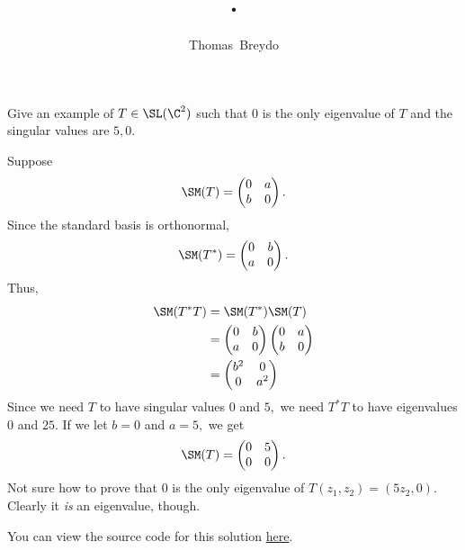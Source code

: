 \documentclass{amsart}
\title{\pagenum.\probnum}
\author{Thomas\ Breydo}
\newcommand{\pagenum}{238}
\newcommand{\probnum}{2}
\begin{document}
\maketitle

\begin{problem*}
Give an example of $T\in\SL(\C^2)$ such that 0 is the only eigenvalue
of $T$ and the singular values are $5,0.$
\end{problem*}

\vspace{0.5in}

Suppose
\begin{align*}
    \SM(T)=\begin{pmatrix}
        0 & a \\
        b & 0
    \end{pmatrix}.
\end{align*}
Since the standard basis is orthonormal,
\begin{align*}
    \SM(T^*)=\begin{pmatrix}
        0 & b \\
        a & 0
    \end{pmatrix}.
\end{align*}
Thus,
\begin{align*}
    \SM(T^* T) &= \SM(T^*)\SM(T) \\
               &= \begin{pmatrix}
                   0 & b \\
                   a & 0
               \end{pmatrix}
               \begin{pmatrix}
                   0 & a \\
                   b & 0
               \end{pmatrix} \\
               &= \begin{pmatrix}
                   b^2 & 0 \\
                   0 & a^2
               \end{pmatrix}
\end{align*}
Since we need $T$ to have singular values $0$ and $5,$ we need $T^*T$
to have eigenvalues $0$ and $25.$ If we let $b=0$ and $a=5,$ we get
\begin{align*}
    \SM(T)=\begin{pmatrix}
        0 & 5 \\
        0 & 0
    \end{pmatrix}.
\end{align*}
Not sure how to prove that $0$ is the only eigenvalue of
$T(z_1,z_2)=(5z_2,0).$ Clearly it \textit{is} an eigenvalue,
though.

\vspace{0.5in}

\begin{note*}
You can view the source code for this solution
\href{https://github.com/thomasbreydo/linalg/blob/main/\pagenum_\probnum_Thomas_Breydo.tex}
{here}.
\end{note*}
\end{document}
